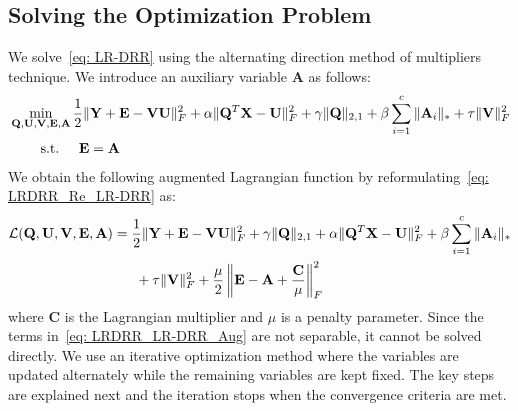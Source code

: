 \subsection{Solving the Optimization Problem}
%
We solve~\eqref{eq: LR-DRR} using the alternating direction method of multipliers ~\cite{ADMM} technique. We introduce an auxiliary variable $\mathbf{A}$ as follows:
%
\begin{equation}
    \begin{split}
        \label{eq: LRDRR_Re_LR-DRR}
        & \min_{\mathbf{Q}, \mathbf{U}, \mathbf{V}, \mathbf{E}, \mathbf{A}}  \frac{1}{2} \| \mathbf{Y} + \mathbf{E} - \mathbf{V} \mathbf{U} \|_{F}^{2} + \alpha \| \mathbf{Q}^{T} \mathbf{X} - \mathbf{U} \|_{F}^{2} + 
        \gamma \| \mathbf{Q} \|_{2,1} + \beta \sum_{i=1}^{c} \| \mathbf{A}_{i} \|_{*} + \tau \| \mathbf{V} \|_{F}^{2} \\ 
        & \hspace{0.8cm} \text{s.t.} \hspace{0.5cm} \mathbf{E} = \mathbf{A}
    \end{split}
\end{equation}
%
We obtain the following augmented Lagrangian function by reformulating~\eqref{eq: LRDRR_Re_LR-DRR} as:
%
\begin{equation}
    \begin{split}
        \label{eq: LRDRR_LR-DRR_Aug}
         & \mathcal{L}(\mathbf{Q}, \mathbf{U}, \mathbf{V}, \mathbf{E}, \mathbf{A})=  \frac{1}{2} \| \mathbf{Y} + \mathbf{E} - \mathbf{V} \mathbf{U} \|_{F}^{2} + \gamma \| \mathbf{Q} \|_{2,1}  + \alpha \| \mathbf{Q}^{T} \mathbf{X} - \mathbf{U} \|_{F}^{2} + \beta \sum_{i=1}^{c} \| \mathbf{A}_{i} \|_{*} \\ & \hspace{3.2cm} +  \tau \| \mathbf{V} \|_{F}^{2} + \frac{\mu}{2} \left\| \mathbf{E} - \mathbf{A} + \frac{\mathbf{C}}{\mu} \right\|_{F}^{2}
    \end{split}
\end{equation}
%
where $\mathbf{C}$ is the Lagrangian multiplier and $\mu$ is a penalty parameter. Since the terms in~\eqref{eq: LRDRR_LR-DRR_Aug} are not separable, it cannot be solved directly. We use an iterative optimization method where the variables are updated alternately while the remaining variables are kept fixed. The key steps are explained next and the iteration stops when the convergence criteria are met.

